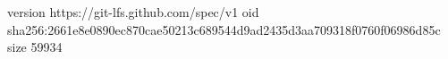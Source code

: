 version https://git-lfs.github.com/spec/v1
oid sha256:2661e8e0890ec870cae50213c689544d9ad2435d3aa709318f0760f06986d85c
size 59934
